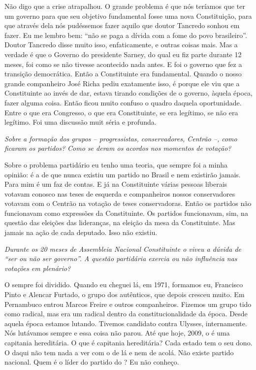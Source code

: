 Não digo que a crise atrapalhou. O grande problema é que
nós teríamos que ter um governo para que seu objetivo fundamental fosse
uma nova Constituição, para que através dela nós pudéssemos fazer aquilo
que doutor Tancredo sonhou em fazer. Eu me lembro bem: ``não se paga a
dívida com a fome do povo brasileiro''. Doutor Tancredo disse muito
isso, enfaticamente, e outras coisas mais. Mas a verdade é que o Governo
do presidente Sarney, do qual eu fiz parte durante 12 meses, foi como se
não tivesse acontecido nada antes. E foi o governo que fez a transição
democrática. Então a Constituinte era fundamental. Quando o nosso grande
companheiro José Richa pediu exatamente isso, é porque ele viu que a
Constituinte ao invés de dar, estava tirando condições de o governo,
àquela época, fazer alguma coisa. Então ficou muito confuso o quadro
daquela oportunidade. Entre o que era Congresso, o que era Constituinte,
se era legítimo, se não era legítimo. Foi uma discussão muit séria e
profunda.

\medskip

\noindent\emph{Sobre a formação dos grupos -- progressistas, conservadores,
Centrão --, como ficaram os partidos? Como se deram os acordos nos
momentos de votação?}

Sobre o problema partidário eu tenho uma teoria, que
sempre foi a minha opinião: é a de que nunca existiu um partido no
Brasil e nem existirão jamais. Para mim é um faz de contas. E já na
Constituinte várias pessoas liberais votavam conosco nas teses de
esquerda e companheiros nossos conservadores votavam com o Centrão na
votação de teses conservadoras. Então os partidos não funcionavam como
expressões da Constituinte. Os partidos funcionavam, sim, na questão das
eleições das lideranças, na eleição da mesa da Constituinte. Mas jamais
na ação de cada deputado. Isso não existiu.

\medskip

\noindent\emph{Durante os 20 meses de Assembleia Nacional Constituinte o 
viveu a dúvida de ``ser ou não ser governo''. A questão partidária
exercia ou não influência nas votações em plenário?}

O  sempre foi dividido. Quando eu cheguei lá, em
1971, formamos eu, Francisco Pinto e Alencar Furtado, o grupo dos
autênticos, que depois cresceu muito. Em Pernambuco entrou Marcos Freire
e outros companheiros. Fizemos um grupo tido como radical, mas era um
radical dentro da constitucionalidade da época. Desde aquela época
estamos lutando. Tivemos candidato contra Ulysses, internamente. Nós
lutávamos sempre e essa coisa não parou. Até que hoje, 2009, o  é
uma capitania hereditária. O que é capitania hereditária? Cada estado
tem o seu dono. O  daqui não tem nada a ver com o  de lá e nem
de acolá. Não existe partido nacional. Quem é o líder do partido do
? Eu não conheço.

